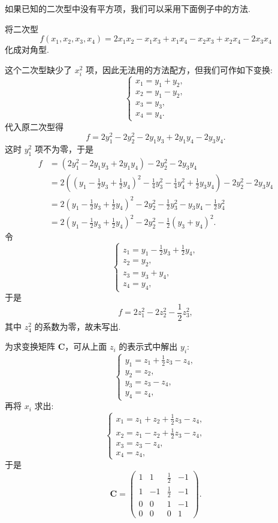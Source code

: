 \documentclass[../../main.tex]{subfiles}
\begin{document}
如果已知的二次型中没有平方项，我们可以采用下面例子中的方法.
\begin{example}
将二次型
\[
f(x_1,x_2,x_3,x_4)=2x_1x_2 - x_1x_3 + x_1x_4 - x_2x_3 + x_2x_4 - 2x_3x_4
\]
化成对角型.
\end{example}
\begin{solution}
这个二次型缺少了 $x_i^2$ 项，因此无法用的方法配方，但我们可作如下变换:
\[
\begin{cases}
x_1 = y_1 + y_2,\\
x_2 = y_1 - y_2,\\
x_3 = y_3,\\
x_4 = y_4.
\end{cases}
\]
代入原二次型得
\[
f = 2y_1^2 - 2y_2^2 - 2y_1y_3 + 2y_1y_4 - 2y_3y_4.
\]
这时 $y_1^2$ 项不为零，于是
\begin{align*}
f&=(2y_1^2 - 2y_1y_3 + 2y_1y_4) - 2y_2^2 - 2y_3y_4\\
&=2\left((y_1 - \frac{1}{2}y_3 + \frac{1}{2}y_4)^2 - \frac{1}{4}y_3^2 - \frac{1}{4}y_4^2 + \frac{1}{2}y_3y_4\right) - 2y_2^2 - 2y_3y_4\\
&=2(y_1 - \frac{1}{2}y_3 + \frac{1}{2}y_4)^2 - 2y_2^2 - \frac{1}{2}y_3^2 - y_3y_4 - \frac{1}{2}y_4^2\\
&=2(y_1 - \frac{1}{2}y_3 + \frac{1}{2}y_4)^2 - 2y_2^2 - \frac{1}{2}(y_3 + y_4)^2.
\end{align*}
令
\[
\begin{cases}
z_1 = y_1 - \frac{1}{2}y_3 + \frac{1}{2}y_4,\\
z_2 = y_2,\\
z_3 = y_3 + y_4,\\
z_4 = y_4,
\end{cases}
\]
于是
\[
f = 2z_1^2 - 2z_2^2 - \frac{1}{2}z_3^2,
\]
其中 $z_4^2$ 的系数为零，故未写出.

为求变换矩阵 $\boldsymbol{C}$，可从上面 $z_i$ 的表示式中解出 $y_i$:
\[
\begin{cases}
y_1 = z_1 + \frac{1}{2}z_3 - z_4,\\
y_2 = z_2,\\
y_3 = z_3 - z_4,\\
y_4 = z_4,
\end{cases}
\]
再将 $x_i$ 求出:
\[
\begin{cases}
x_1 = z_1 + z_2 + \frac{1}{2}z_3 - z_4,\\
x_2 = z_1 - z_2 + \frac{1}{2}z_3 - z_4,\\
x_3 = z_3 - z_4,\\
x_4 = z_4,
\end{cases}
\]
于是
\[
\boldsymbol{C}=
\begin{pmatrix}
1 & 1 & \frac{1}{2} & -1\\
1 & -1 & \frac{1}{2} & -1\\
0 & 0 & 1 & -1\\
0 & 0 & 0 & 1
\end{pmatrix}.
\] 
\end{solution}
\end{document}
